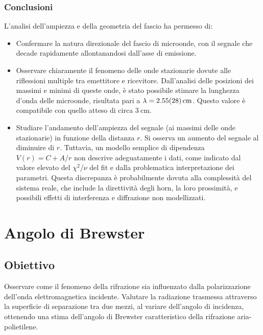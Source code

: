 \documentclass[a4paper]{article}
\begin{document}
\subsubsection{Conclusioni}
L'analisi dell'ampiezza e della geometria del fascio ha permesso di:
\begin{itemize}
    \item Confermare la natura direzionale del fascio di microonde, con il segnale che decade rapidamente allontanandosi dall'asse di emissione.
    \item Osservare chiaramente il fenomeno delle onde stazionarie dovute alle riflessioni multiple tra emettitore e ricevitore. Dall'analisi delle posizioni dei massimi e minimi di queste onde, è stato possibile stimare la lunghezza d'onda delle microonde, risultata pari a $\lambda = \SI{2.55 \pm 0.28}{\centi\metre}$. Questo valore è compatibile con quello atteso di circa $\SI{3}{\centi\metre}$.
    \item Studiare l'andamento dell'ampiezza del segnale (ai massimi delle onde stazionarie) in funzione della distanza $r$. Si osserva un aumento del segnale al diminuire di $r$. Tuttavia, un modello semplice di dipendenza $V(r) = C+A/r$ non descrive adeguatamente i dati, come indicato dal valore elevato del $\chi^2/\nu$ del fit e dalla problematica interpretazione dei parametri. Questa discrepanza è probabilmente dovuta alla complessità del sistema reale, che include la direttività degli horn, la loro prossimità, e possibili effetti di interferenza e diffrazione non modellizzati.
\end{itemize}


\section{Angolo di Brewster}
\subsection{Obiettivo}
Osservare come il fenomeno della rifrazione sia influenzato dalla polarizzazione dell'onda elettromagnetica incidente. Valutare la radiazione trasmessa attraverso la superficie di separazione tra due mezzi, al variare dell'angolo di incidenza, ottenendo una stima dell'angolo di Brewster caratteristico della rifrazione aria-polietilene. 
\end{document}
